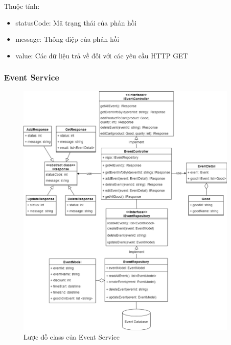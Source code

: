 Thuộc tính:
\begin{itemize}
	\item statusCode: Mã trạng thái của phản hồi
	\item message: Thông điệp của phản hồi
	\item value: Các dữ liệu trả về đối với các yêu cầu HTTP GET
\end{itemize}



\subsubsection{Event Service}
\begin{figure}[!htp]
	\centering
	\includegraphics[width=11cm]{img/Architecture/service/EventService.png}
	\newline
	\caption{Lược đồ class của Event Service}
\end{figure}


